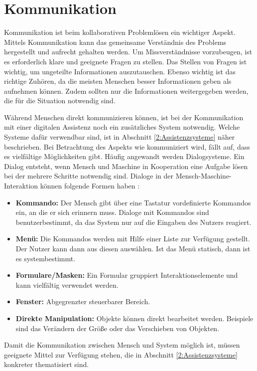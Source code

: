 \section{Kommunikation}
Kommunikation ist beim kollaborativen Problemlösen ein wichtiger Aspekt. Mittels Kommunikation kann das gemeinsame Verständnis des Problems hergestellt und aufrecht gehalten werden. Um Missverständnisse vorzubeugen, ist es erforderlich klare und geeignete Fragen zu stellen. Das Stellen von Fragen ist wichtig, um ungeteilte Informationen auszutauschen. Ebenso wichtig ist das richtige Zuhören, da die meisten Menschen besser Informationen geben als aufnehmen können. Zudem sollten nur die Informationen weitergegeben werden, die für die Situation notwendig sind. \cite{Rohner2016}

Während Menschen direkt kommunizieren können, ist bei der Kommunikation mit einer digitalen Assistenz noch ein zusätzliches System notwendig. Welche Systeme dafür verwendbar sind, ist in Abschnitt \ref{2:Assistenzsysteme} näher beschrieben. Bei Betrachtung des Aspekts wie kommuniziert wird, fällt auf, dass es vielfältige Möglichkeiten gibt. Häufig angewandt werden Dialogsysteme. Ein Dialog entsteht, wenn Mensch und Maschine in Kooperation eine Aufgabe lösen bei der mehrere Schritte notwendig sind. Dialoge in der Mensch-Maschine-Interaktion können folgende Formen haben \cite{Heinecke2012}:
\begin{itemize}
\item \textbf{Kommando:} Der Mensch gibt über eine Tastatur vordefinierte Kommandos ein, an die er sich erinnern muss. Dialoge mit Kommandos sind benutzerbestimmt, da das System nur auf die Eingaben des Nutzers reagiert.
\item \textbf{Menü:} Die Kommandos werden mit Hilfe einer Liste zur Verfügung gestellt. Der Nutzer kann dann aus diesen auswählen. Ist das Menü statisch, dann ist es systembestimmt.
\item \textbf{Formulare/Masken:} Ein Formular gruppiert Interaktionselemente und kann vielfältig verwendet werden.
\item \textbf{Fenster:} Abgegrenzter steuerbarer Bereich.
\item \textbf{Direkte Manipulation:} Objekte können direkt bearbeitet werden. Beispiele sind das Verändern der Größe oder das Verschieben von Objekten.
\end{itemize}
Damit die Kommunikation zwischen Mensch und System möglich ist, müssen geeignete Mittel zur Verfügung stehen, die in Abschnitt \ref{2:Assistenzsysteme} konkreter thematisiert sind.

